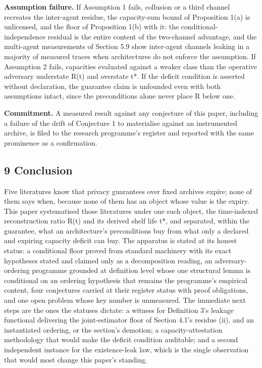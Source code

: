 \documentclass[
]{llncs}
\begin{document}
\textbf{Assumption failure.} If Assumption 1 fails, collusion or a third
channel recreates the inter-agent residue, the capacity-sum bound of
Proposition 1(a) is unlicensed, and the floor of Proposition 1(b) with
it: the conditional-independence residual is the entire content of the
two-channel advantage, and the multi-agent measurements of Section 5.9
show inter-agent channels leaking in a majority of measured traces when
architectures do not enforce the assumption. If Assumption 2 fails,
capacities evaluated against a weaker class than the operative adversary
understate R(t) and overstate t*. If the deficit condition is asserted
without declaration, the guarantee claim is unfounded even with both
assumptions intact, since the preconditions alone never place R below
one.

\textbf{Commitment.} A measured result against any conjecture of this
paper, including a failure of the drift of Conjecture 1 to materialise
against an instrumented archive, is filed to the research programme's
register and reported with the same prominence as a confirmation.

\subsection{9 Conclusion}\label{conclusion}

Five literatures know that privacy guarantees over fixed archives
expire; none of them says when, because none of them has an object whose
value is the expiry. This paper systematised those literatures under one
such object, the time-indexed reconstruction ratio R(t) and its derived
shelf life t*, and separated, within the guarantee, what an
architecture's preconditions buy from what only a declared and expiring
capacity deficit can buy. The apparatus is stated at its honest status:
a conditional floor proved from standard machinery with its exact
hypotheses stated and claimed only as a decomposition reading, an
adversary-ordering programme grounded at definition level whose one
structural lemma is conditional on an ordering hypothesis that remains
the programme's empirical content, four conjectures carried at their
register status with proof obligations, and one open problem whose key
number is unmeasured. The immediate next steps are the ones the statuses
dictate: a witness for Definition 3's leakage functional delivering the
joint-estimator floor of Section 4.1's residue (ii), and an instantiated
ordering, or the section's demotion; a capacity-attestation methodology
that would make the deficit condition auditable; and a second
independent instance for the existence-leak law, which is the single
observation that would most change this paper's standing.
\end{document}

